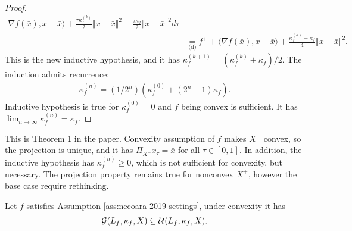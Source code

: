\documentclass[12pt]{report}
\begin{document}
\begin{proof}
{\begin{align*}
                            \nabla f(\bar x), x - \bar x
                        \rangle
                        + \frac{\tau\kappa_f^{(k)}}{2} \Vert x - \bar x\Vert^2
                        + \frac{\tau\kappa_f}{2}\Vert x - \bar x\Vert^2
                    d\tau
                    \\
                    &\underset{\text{(d)}}{=} 
                    f^+ + 
                    \langle 
                        \nabla f(\bar x), x - \bar x
                    \rangle
                    +
                    \frac{\kappa^{(k)}_f + \kappa_f}{4}
                    \Vert x - \bar x\Vert^2. 
                \end{align*}
                }
                This is the new inductive hypothesis, and it has $\kappa_f^{(k + 1)} = (\kappa_f^{(k)} + \kappa_f)/2$. 
                The induction admits recurrence: 
                \begin{align*}
                    \kappa_f^{(n)} = (1/2^n)(\kappa_f^{(0)} + (2^n - 1)\kappa_f). 
                \end{align*}
                Inductive hypothesis is true for $\kappa_f^{(0)} = 0$ and $f$ being convex is sufficient. 
                It has $\lim_{n\rightarrow \infty} \kappa_f^{(n)} = \kappa_f$. 
            \end{proof}
            \begin{remark}
                This is Theorem 1 in the paper. 
                Convexity assumption of $f$ makes $X^+$ convex, so the projection is unique, and it has $\Pi_{X^+}x_\tau = \bar x$ for all $\tau \in [0, 1]$. 
                In addition, the inductive hypothesis has $\kappa_f^{(n)} \ge 0$, which is not sufficient for convexity, but necessary. 
                The projection property remains true for nonconvex $X^+$, however the base case require rethinking. 
            \end{remark}
            \begin{theorem}\label{thm:qgg-implies-qua}
                Let $f$ satisfies Assumption \ref{ass:necoara-2019-settings}, under convexity it has 
                \begin{align*}
                    \mathcal G(L_f, \kappa_f, X)\subseteq \mathcal U(L_f, \kappa_f, X). 
                \end{align*}
            \end{theorem}
\end{document}
